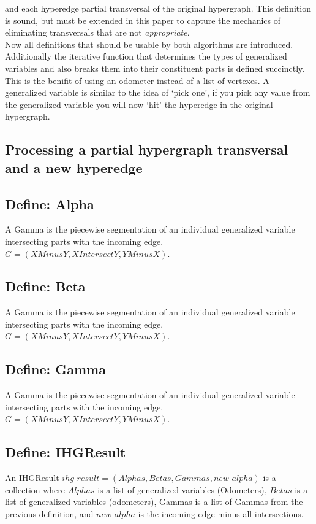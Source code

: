  and each hyperedge partial transversal of the original hypergraph. This definition is sound, but must be extended in this paper to capture the mechanics of eliminating transversals that are not \textit{appropriate}.\\

Now all definitions that should be usable by both algorithms are introduced. Additionally the iterative function that determines the types of generalized variables and also breaks them into their constituent parts is defined succinctly.\\

	 This is the benifit of using an odometer instead of a list of vertexes. A generalized variable is similar to the idea of `pick one', if you pick any value from the generalized variable you will now `hit' the hyperedge in the original hypergraph. \\



\subsection{Processing a partial hypergraph transversal and a new hyperedge}


\subsection{Define: Alpha}
A Gamma is the piecewise segmentation of an individual generalized variable intersecting parts with the incoming edge. $G = (XMinusY, XIntersectY, YMinusX)$.

\subsection{Define: Beta}
A Gamma is the piecewise segmentation of an individual generalized variable intersecting parts with the incoming edge. $G = (XMinusY, XIntersectY, YMinusX)$.

\subsection{Define: Gamma}
A Gamma is the piecewise segmentation of an individual generalized variable intersecting parts with the incoming edge. $G = (XMinusY, XIntersectY, YMinusX)$.


\subsection{Define: IHGResult }
An IHGResult $ihg\_result = (Alphas,Betas,Gammas,new\_alpha)$ is a collection where $Alphas$ is a list of generalized variables (Odometers), $Betas$ is a list of generalized variables (odometers), Gammas is a list of Gammas from the previous definition, and $new\_alpha$ is the incoming edge minus all 
intersections.


